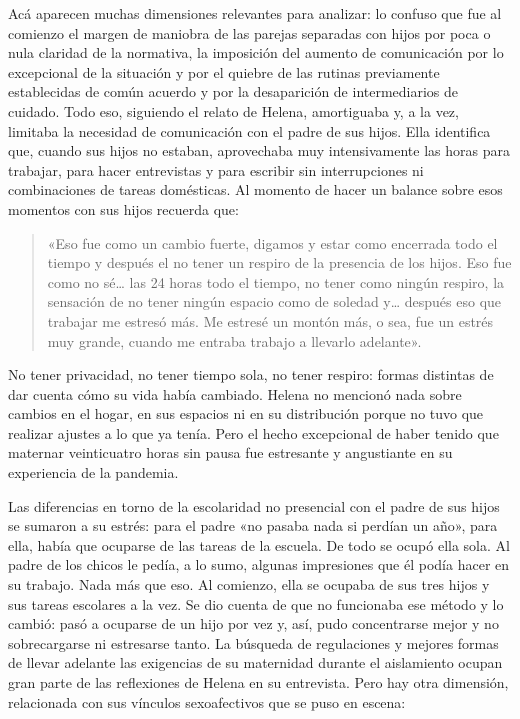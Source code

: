 Acá aparecen muchas dimensiones relevantes para analizar: lo confuso que fue al comienzo el margen de maniobra de las parejas separadas con hijos por poca o nula claridad de la normativa, la imposición del aumento de comunicación por lo excepcional de la situación y por el quiebre de las rutinas previamente establecidas de común acuerdo y por la desaparición de intermediarios de cuidado. Todo eso, siguiendo el relato de Helena, amortiguaba y, a la vez, limitaba la necesidad de comunicación con el padre de sus hijos. Ella identifica que, cuando sus hijos no estaban, aprovechaba muy intensivamente las horas para trabajar, para hacer entrevistas y para escribir sin interrupciones ni combinaciones de tareas domésticas. Al momento de hacer un balance sobre esos momentos con sus hijos recuerda que:

\begin{quote}
«Eso fue como un cambio fuerte, digamos y estar como encerrada todo el tiempo y después el no tener un respiro de la presencia de los hijos. Eso fue como no sé\ldots{} las 24 horas todo el tiempo, no tener como ningún respiro, la sensación de no tener ningún espacio como de soledad y\ldots{} después eso que trabajar me estresó más. Me estresé un montón más, o sea, fue un estrés muy grande, cuando me entraba trabajo a llevarlo adelante».
\end{quote}

No tener privacidad, no tener tiempo sola, no tener respiro: formas distintas de dar cuenta cómo su vida había cambiado. Helena no mencionó nada sobre cambios en el hogar, en sus espacios ni en su distribución porque no tuvo que realizar ajustes a lo que ya tenía. Pero el hecho excepcional de haber tenido que maternar veinticuatro horas sin pausa fue estresante y angustiante en su experiencia de la pandemia.

Las diferencias en torno de la escolaridad no presencial con el padre de sus hijos se sumaron a su estrés: para el padre «no pasaba nada si perdían un año», para ella, había que ocuparse de las tareas de la escuela. De todo se ocupó ella sola. Al padre de los chicos le pedía, a lo sumo, algunas impresiones que él podía hacer en su trabajo. Nada más que eso. Al comienzo, ella se ocupaba de sus tres hijos y sus tareas escolares a la vez. Se dio cuenta de que no funcionaba ese método y lo cambió: pasó a ocuparse de un hijo por vez y, así, pudo concentrarse mejor y no sobrecargarse ni estresarse tanto. La búsqueda de regulaciones y mejores formas de llevar adelante las exigencias de su maternidad durante el aislamiento ocupan gran parte de las reflexiones de Helena en su entrevista. Pero hay otra dimensión, relacionada con sus vínculos sexoafectivos que se puso en escena:


